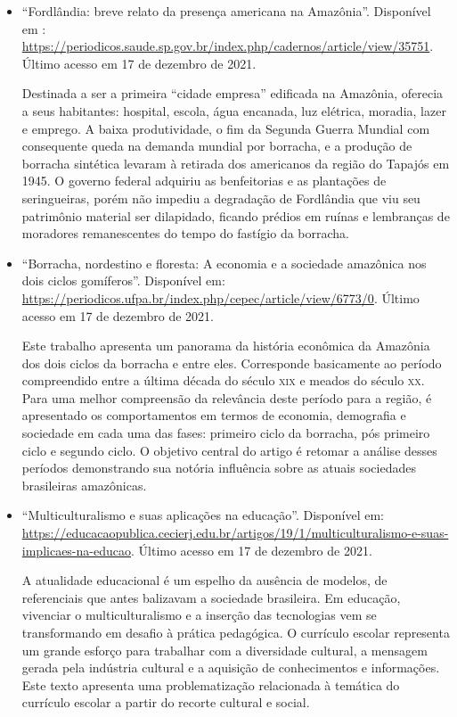 \documentclass[11pt]{extarticle}
\begin{document}
\begin{itemize}
	\item ``Fordlândia: breve relato da presença americana na Amazônia''. Disponível em : \url{https://periodicos.saude.sp.gov.br/index.php/cadernos/article/view/35751}. Último acesso em 17 de dezembro de 2021.

	Destinada a ser a primeira “cidade empresa” edificada na Amazônia, oferecia a seus habitantes: hospital, escola, água encanada, luz elétrica, moradia, lazer e emprego. A baixa produtividade, o fim da Segunda Guerra Mundial com consequente queda na demanda mundial por borracha, e a produção de borracha sintética levaram à retirada dos americanos da região do Tapajós em 1945. O governo federal adquiriu as benfeitorias e as plantações de seringueiras, porém não impediu a degradação de Fordlândia que viu seu patrimônio material ser dilapidado, ficando prédios em ruínas e lembranças de moradores remanescentes do tempo do fastígio da borracha. 


	\item ``Borracha, nordestino e floresta: A economia e a sociedade amazônica nos dois ciclos gomíferos''. Disponível em: \url{https://periodicos.ufpa.br/index.php/cepec/article/view/6773/0}. Último acesso em 17 de dezembro de 2021.
	
	Este trabalho apresenta um panorama da história econômica da Amazônia dos dois ciclos da borracha e entre eles. Corresponde basicamente ao período compreendido entre a última década do século \textsc{xix} e meados do século \textsc{xx}. Para uma melhor compreensão da relevância deste período para a região, é apresentado os comportamentos em termos de economia, demografia e sociedade em cada uma das fases: primeiro ciclo da borracha, pós primeiro ciclo e segundo ciclo. O objetivo central do artigo é retomar a análise desses períodos demonstrando sua notória influência sobre as atuais sociedades brasileiras amazônicas.

	\item ``Multiculturalismo e suas aplicações na educação''. Disponível em: \url{https://educacaopublica.cecierj.edu.br/artigos/19/1/multiculturalismo-e-suas-implicaes-na-educao}. Último acesso em 17 de dezembro de 2021.

	A atualidade educacional é um espelho da ausência de modelos, de referenciais que antes balizavam a sociedade brasileira. Em educação, vivenciar o multiculturalismo e a inserção das tecnologias vem se transformando em desafio à prática pedagógica. O currículo escolar representa um grande esforço para trabalhar com a diversidade cultural, a mensagem gerada pela indústria cultural e a aquisição de conhecimentos e informações. Este texto apresenta uma problematização relacionada à temática do currículo escolar a partir do recorte cultural e social.
\end{itemize}
\end{document}
